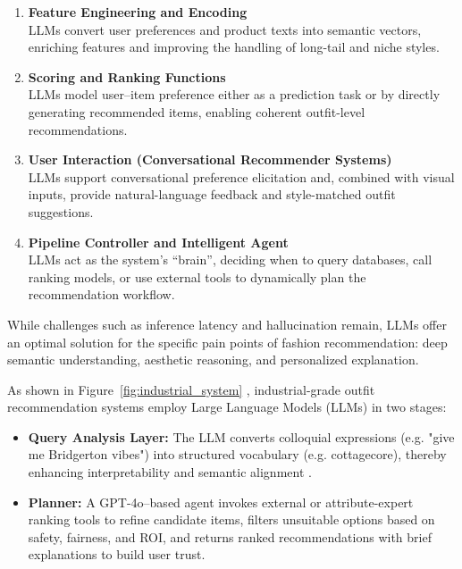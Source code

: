 \begin{enumerate}[label=(\alph*)]
    \item \textbf{Feature Engineering and Encoding}\\
    LLMs convert user preferences and product texts into semantic vectors, enriching features and improving the handling of long-tail and niche styles.

    \item \textbf{Scoring and Ranking Functions}\\
    LLMs model user–item preference either as a prediction task or by directly generating recommended items, enabling coherent outfit-level recommendations.

    \item \textbf{User Interaction (Conversational Recommender Systems)}\\
    LLMs support conversational preference elicitation and, combined with visual inputs, provide natural-language feedback and style-matched outfit suggestions.

    \item \textbf{Pipeline Controller and Intelligent Agent}\\
    LLMs act as the system’s “brain”, deciding when to query databases, call ranking models, or use external tools to dynamically plan the recommendation workflow.
\end{enumerate}


While challenges such as inference latency and hallucination remain, LLMs offer an optimal solution for the specific pain points of fashion recommendation: deep semantic understanding, aesthetic reasoning, and personalized explanation.



As shown in Figure~\ref{fig:industrial_system} \citep{deldjoo2025agentic}, industrial-grade outfit recommendation systems employ Large Language Models (LLMs) in two stages: 
\begin{itemize}
\item \textbf{Query Analysis Layer: }
The LLM converts colloquial expressions (e.g. "give me Bridgerton vibes") into structured vocabulary (e.g. cottagecore), thereby enhancing interpretability and semantic alignment \citep{deldjoo2025agentic}.

\item \textbf{Planner: }
A GPT-4o–based agent invokes external or attribute-expert ranking tools to refine candidate items, filters unsuitable options based on safety, fairness, and ROI, and returns ranked recommendations with brief explanations to build user trust.
\end{itemize}

